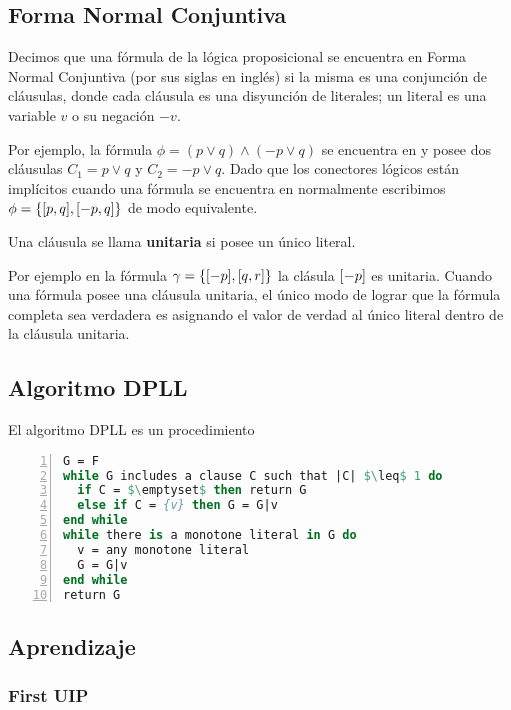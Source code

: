 \subsection{Forma Normal Conjuntiva}

Decimos que una fórmula de la lógica proposicional se encuentra en Forma Normal
Conjuntiva (\cnf por sus siglas en inglés) si la misma es una conjunción de
cláusulas, donde cada cláusula es una disyunción de literales; un literal es una
variable $v$ o su negación $-v$.

Por ejemplo, la fórmula $\phi = (p \vee q) \wedge (-p \vee q)$ se encuentra
en \cnf y posee dos cláusulas $C_1 = p \vee q$ y $C_2 = -p \vee q$. Dado que los
conectores lógicos están implícitos cuando una fórmula se encuentra en \cnf
normalmente escribimos $\phi = \{[p, q], [-p, q]\}$ de modo equivalente.

\begin{definition} 
 Una cláusula se llama \textbf{unitaria} si
posee un único literal.
\end{definition}
Por ejemplo
en la fórmula $\gamma = \{[-p], [q, r]\}$ la clásula $[-p]$ es
unitaria. Cuando una fórmula \cnf posee una cláusula unitaria, el único modo de
lograr que la fórmula completa sea verdadera es asignando el valor de verdad
\true al único literal dentro de la cláusula unitaria.

\subsection{Algoritmo DPLL}

El algoritmo DPLL es un procedimiento 

\begin{lstlisting}[mathescape,language=Pascal,frame=single,numbers=left,caption={Algoritmo
DPLL}] G = F
while G includes a clause C such that |C| $\leq$ 1 do
  if C = $\emptyset$ then return G
  else if C = {v} then G = G|v
end while
while there is a monotone literal in G do
  v = any monotone literal
  G = G|v
end while
return G
\end{lstlisting}

\subsection{Aprendizaje}
\subsubsection{First UIP}
